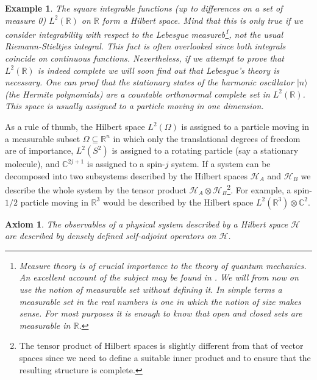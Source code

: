 \documentclass{article}
\newtheorem{axiom}{Axiom}
\newtheorem{example}{Example}
\begin{document}
\begin{example}
The square integrable functions (up to differences on a set of measure 0) $L^2(\mathbb{R})$ on $\mathbb{R}$ form a Hilbert space. Mind that this is only true if we consider integrability with respect to the Lebesgue measureb\footnote{Measure theory is of crucial importance to the theory of quantum mechanics. An excellent account of the subject may be found in \cite{Hewitt1975}. We will from now on use the notion of measurable set without defining it. In simple terms a measurable set in the real numbers is one in which the notion of size makes sense. For most purposes it is enough to know that open and closed sets are measurable in $\mathbb{R}$.}, not the usual Riemann-Stieltjes integral. This fact is often overlooked since both integrals coincide on continuous functions. Nevertheless, if we attempt to prove that $L^2(\mathbb{R})$ is indeed complete we will soon find out that Lebesgue's theory is necessary. One can proof that the stationary states of the harmonic oscillator $|n\rangle$ (the Hermite polynomials) are a countable orthonormal complete set in $L^2(\mathbb{R})$. This space is usually assigned to a particle moving in one dimension.
\end{example}

As a rule of thumb, the Hilbert space $L^2(\Omega)$ is assigned to a particle moving in a measurable subset $\Omega\subseteq\mathbb{R}^n$ in which only the translational degrees of freedom are of importance, $L^2(S^2)$ is assigned to a rotating particle (say a stationary molecule), and $\mathbb{C}^{2j+1}$ is assigned to a spin-$j$ system. If a system can be decomposed into two subsystems described by the Hilbert spaces $\mathcal{H}_A$ and $\mathcal{H}_B$ we describe the whole system by the tensor product $\mathcal{H}_A\otimes\mathcal{H}_B$\footnote{The tensor product of Hilbert spaces is slightly different from that of vector spaces since we need to define a suitable inner product and to ensure that the resulting structure is complete\cite{Hall2013}.}. For example, a spin-$1/2$ particle moving in $\mathbb{R}^3$ would be described by the Hilbert space $L^2(\mathbb{R}^3)\otimes\mathbb{C}^2$. 

\begin{axiom}
The observables of a physical system described by a Hilbert space $\mathcal{H}$ are described by densely defined self-adjoint operators on $\mathcal{H}$.
\end{axiom}
\end{document}
